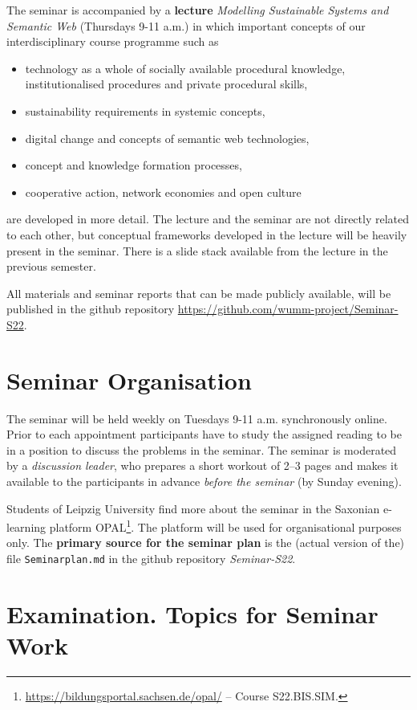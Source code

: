 \documentclass[11pt,a4paper]{article}
\begin{document}
The seminar is accompanied by a \textbf{lecture} \emph{Modelling Sustainable
  Systems and Semantic Web} (Thursdays 9-11 a.m.) in which important concepts
of our interdisciplinary course programme such as
\begin{itemize}[noitemsep]
\item technology as a whole of socially available procedural knowledge,
  institutionalised procedures and private procedural skills, 
\item sustainability requirements in systemic concepts,
\item digital change and concepts of semantic web technologies,
\item concept and knowledge formation processes,
\item cooperative action, network economies and open culture
\end{itemize}
are developed in more detail. The lecture and the seminar are not directly
related to each other, but conceptual frameworks developed in the lecture will
be heavily present in the seminar. There is a slide stack \cite{Slides}
available from the lecture in the previous semester.

All materials and seminar reports that can be made publicly available, will be
published in the github repository
\url{https://github.com/wumm-project/Seminar-S22}.

\section{Seminar Organisation}

The seminar will be held weekly on Tuesdays 9-11 a.m.  synchronously online.
Prior to each appointment participants have to study the assigned reading to
be in a position to discuss the problems in the seminar.  The seminar is
moderated by a \emph{discussion leader}, who prepares a short workout of 2--3
pages and makes it available to the participants in advance \emph{before the
  seminar} (by Sunday evening).

Students of Leipzig University find more about the seminar in the Saxonian
e-learning platform
OPAL\footnote{\url{https://bildungsportal.sachsen.de/opal/} -- Course
  S22.BIS.SIM.}.  The platform will be used for organisational purposes only.
The \textbf{primary source for the seminar plan} is the (actual version of
the) file \texttt{Seminarplan.md} in the github repository \emph{Seminar-S22}.

\section{Examination. Topics for Seminar Work}
\end{document}
